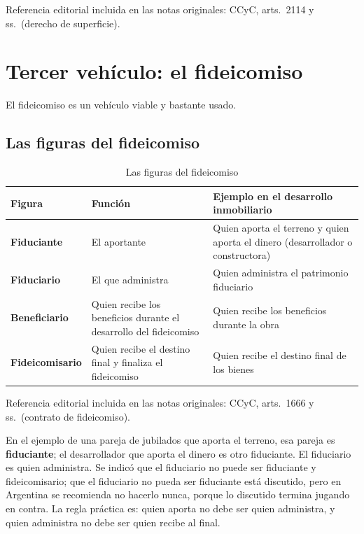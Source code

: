 \documentclass[12pt,oneside]{book}
\begin{document}
\begin{note}
Referencia editorial incluida en las notas originales: CCyC, arts.~2114 y ss.\ (derecho de superficie).
\end{note}

\section{Tercer vehículo: el fideicomiso}

El fideicomiso es un vehículo viable y bastante usado.

\subsection{Las figuras del fideicomiso}

\begin{table}[H]
\centering
\small
\begin{tabularx}{\textwidth}{>{\raggedright\arraybackslash}p{3cm}YY}
\toprule
\textbf{Figura} & \textbf{Función} & \textbf{Ejemplo en el desarrollo inmobiliario} \\
\midrule
\textbf{Fiduciante} & El aportante & Quien aporta el terreno y quien aporta el dinero (desarrollador o constructora) \\
\textbf{Fiduciario} & El que administra & Quien administra el patrimonio fiduciario \\
\textbf{Beneficiario} & Quien recibe los beneficios durante el desarrollo del fideicomiso & Quien recibe los beneficios durante la obra \\
\textbf{Fideicomisario} & Quien recibe el destino final y finaliza el fideicomiso & Quien recibe el destino final de los bienes \\
\bottomrule
\end{tabularx}
\caption{Las figuras del fideicomiso}
\end{table}

\begin{note}
Referencia editorial incluida en las notas originales: CCyC, arts.~1666 y ss.\ (contrato de fideicomiso).
\end{note}

En el ejemplo de una pareja de jubilados que aporta el terreno, esa pareja es \textbf{fiduciante}; el desarrollador que aporta el dinero es otro fiduciante. El fiduciario es quien administra. Se indicó que el fiduciario no puede ser fiduciante y fideicomisario; que el fiduciario no pueda ser fiduciante está discutido, pero en Argentina se recomienda no hacerlo nunca, porque lo discutido termina jugando en contra. La regla práctica es: quien aporta no debe ser quien administra, y quien administra no debe ser quien recibe al final.
\end{document}
